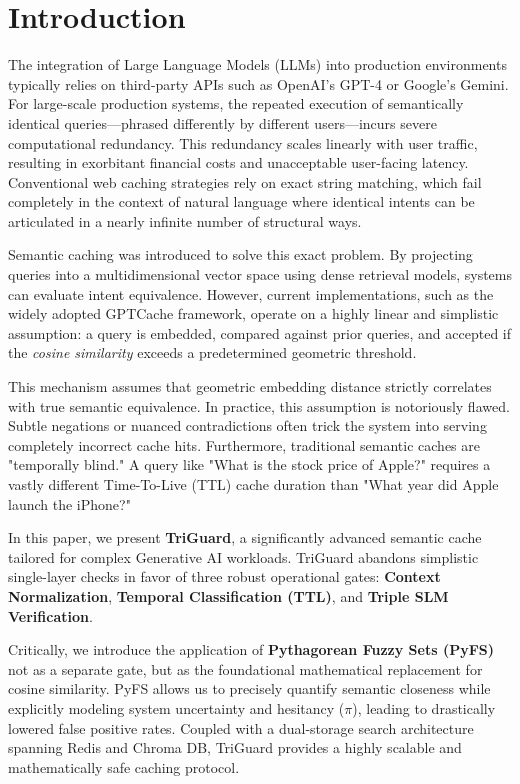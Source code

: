 \documentclass[sigconf]{acmart}
\begin{document}
\fancyhf{}
\fancyhead[LE,RO]{\thepage}

\section{Introduction}

The integration of Large Language Models (LLMs) into production environments typically relies on third-party APIs such as OpenAI's GPT-4 or Google's Gemini. For large-scale production systems, the repeated execution of semantically identical queries---phrased differently by different users---incurs severe computational redundancy. This redundancy scales linearly with user traffic, resulting in exorbitant financial costs and unacceptable user-facing latency. Conventional web caching strategies rely on exact string matching, which fail completely in the context of natural language where identical intents can be articulated in a nearly infinite number of structural ways.

Semantic caching was introduced to solve this exact problem. By projecting queries into a multidimensional vector space using dense retrieval models, systems can evaluate intent equivalence. However, current implementations, such as the widely adopted GPTCache framework, operate on a highly linear and simplistic assumption: a query is embedded, compared against prior queries, and accepted if the \textit{cosine similarity} exceeds a predetermined geometric threshold. 

This mechanism assumes that geometric embedding distance strictly correlates with true semantic equivalence. In practice, this assumption is notoriously flawed. Subtle negations or nuanced contradictions often trick the system into serving completely incorrect cache hits. Furthermore, traditional semantic caches are "temporally blind." A query like "What is the stock price of Apple?" requires a vastly different Time-To-Live (TTL) cache duration than "What year did Apple launch the iPhone?" 

In this paper, we present \textbf{TriGuard}, a significantly advanced semantic cache tailored for complex Generative AI workloads. TriGuard abandons simplistic single-layer checks in favor of three robust operational gates: \textbf{Context Normalization}, \textbf{Temporal Classification (TTL)}, and \textbf{Triple SLM Verification}. 

Critically, we introduce the application of \textbf{Pythagorean Fuzzy Sets (PyFS)} not as a separate gate, but as the foundational mathematical replacement for cosine similarity. PyFS allows us to precisely quantify semantic closeness while explicitly modeling system uncertainty and hesitancy ($\pi$), leading to drastically lowered false positive rates. Coupled with a dual-storage search architecture spanning Redis and Chroma DB, TriGuard provides a highly scalable and mathematically safe caching protocol.
\end{document}
